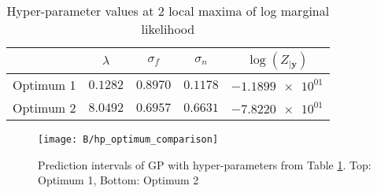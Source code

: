\documentclass[11pt]{article}
\begin{document}
\begin{table}[h]
    \centering
    \begin{tabular}{|c|c|c|c|c|}
        \hline
         & $\lambda$ & $\sigma_f$ & $\sigma_n$ & $\log(Z_{|\textbf{y}})$ \\
        \hline
        Optimum 1 & $0.1282$ & $0.8970$ & $0.1178$ & $\num{-1.1899e+01}$ \\ 
        Optimum 2 & $8.0492$ & $0.6957$ & $0.6631$ & $\num{-7.8220e+01}$ \\ 
        \hline
    \end{tabular}
    \caption{Hyper-parameter values at 2 local maxima of log marginal likelihood}
    \label{table:B_hyper_parameter_optima}
\end{table}

\begin{figure}[h]
    \centering
    \texttt{[image: B/hp\_optimum\_comparison]}
    \caption{Prediction intervals of GP with hyper-parameters from Table \ref{table:B_hyper_parameter_optima}. Top: Optimum 1, Bottom: Optimum 2}
    \label{fig:B_hyper_parameter_optimum_comparison}
\end{figure}
\end{document}
